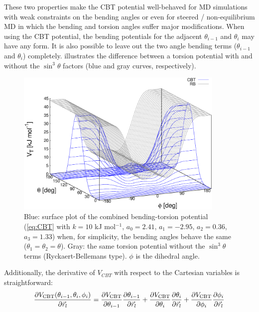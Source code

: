 These two  properties make the CBT potential well-behaved for MD simulations with weak constraints
on the bending angles or even for steered / non-equilibrium MD in which the bending and torsion angles suffer major
modifications.
When using the CBT potential, the bending potentials for the adjacent $\theta_{i-1}$ and $\theta_i$ may have any form.
It is also possible to leave out the two angle bending terms ($\theta_{i-1}$ and $\theta_{i}$) completely.
 illustrates the difference between a torsion potential with and without the $\sin^{3}\theta$ factors
(blue and gray curves, respectively).
%
\begin{figure}
\centerline{\includegraphics[width=10cm]{plots/fig-04}}
\caption{Blue: surface plot of the combined bending-torsion potential
(\ref{eq:CBT} with $k = 10$ kJ mol$^{-1}$, $a_0=2.41$, $a_1=-2.95$, $a_2=0.36$, $a_3=1.33$)
when, for simplicity, the bending angles behave the same ($\theta_1=\theta_2=\theta$).
Gray: the same torsion potential without the $\sin^{3}\theta$ terms (Ryckaert-Bellemans type).
$\phi$ is the dihedral angle.}
\label{fig:CBT}
\end{figure}
%
Additionally, the derivative of $V_{CBT}$ with respect to the Cartesian variables is straightforward:
%
\begin{equation}
\frac{\partial V_{\rm CBT}(\theta_{i-1},\theta_i,\phi_i)} {\partial \vec r_{l}} = \frac{\partial V_{\rm CBT}}{\partial \theta_{i-1}} \frac{\partial \theta_{i-1}}{\partial \vec r_{l}} +
                                                                                  \frac{\partial V_{\rm CBT}}{\partial \theta_{i  }} \frac{\partial \theta_{i  }}{\partial \vec r_{l}} +
                                                                                  \frac{\partial V_{\rm CBT}}{\partial \phi_{i    }} \frac{\partial \phi_{i    }}{\partial \vec r_{l}}
\label{eq:force_cbt}
\end{equation}
